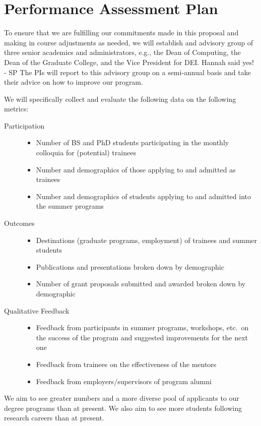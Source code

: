 \documentclass[11pt]{NSFamsart}
\begin{document}
\section{Performance Assessment Plan  }
 
To ensure that we are fulfilling our commitments made in this proposal and making in course adjustments as needed, we will establish and advisory group of three senior academics and administrators, e.g., the Dean of Computing, the Dean of the Graduate College, and the Vice President for DEI. 
{\color{magenta}Hannah said yes! - SP}
The PIs will report to this advisory group on a semi-annual basis and take their advice on how to improve our program.

We will specifically collect and evaluate the following data on the following metrics:

\begin{description}
	\item[Participation] \phantom{a}
	\begin{itemize}
		\item Number of BS and PhD students participating in the monthly colloquia for (potential) trainees
		\item Number and demographics of those applying to and admitted as trainees
		\item Number and demographics of students applying to and admitted into the summer programs
	\end{itemize}
	\item[Outcomes] \phantom{a}
	\begin{itemize}
		\item Destinations (graduate programs, employment) of trainees and summer students
		\item Publications and presentations broken down by demographic
		\item Number of grant proposals submitted and awarded broken down by demographic
	\end{itemize}
	\item[Qualitative Feedback] \phantom{a}
\begin{itemize}
\item Feedback from participants in summer programs, workshops, etc.\ on the success of the program and suggested improvements for the next one
\item Feedback from trainees on the effectiveness of the mentors
\item Feedback from employers/supervisors of program alumni
\end{itemize}
\end{description}
We aim to see greater numbers and a more diverse pool of  applicants to our degree programs than at present.  We also aim to see more students following research careers than at present.  
 
\end{document}
